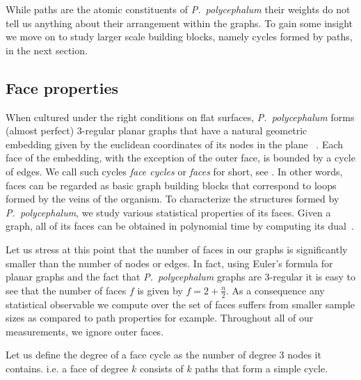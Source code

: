 		While paths are the atomic constituents of \emph{P.~polycephalum} their weights do not tell us anything about their arrangement within the graphs. To gain some insight we move on to study larger scale building blocks, namely cycles formed by paths, in the next section.

	\subsection{Face properties}

		When cultured under the right conditions on flat surfaces, \emph{P.~polycephalum} forms (almost perfect) $3$-regular planar graphs that have a natural geometric embedding given by the euclidean coordinates of its nodes in the plane ~\cite{baumgarten2010plasmodial}. Each face of the embedding, with the exception of the outer face, is bounded by a cycle of edges. We call such cycles \emph{face cycles} or \emph{faces} for short, see . In other words, faces can be regarded as basic graph building blocks that correspond to loops formed by the veins of the organism. To characterize the structures formed by \emph{P.~polycephalum}, we study various statistical properties of its faces. Given a graph, all of its faces can be obtained in polynomial time by computing its dual~\cite{mehlhorn1995leda}. 

		Let us stress at this point that the number of faces in our graphs is significantly smaller than the number of nodes or edges. In fact, using Euler's formula for planar graphs and the fact that \emph{P.~polycephalum} graphs are $3$-regular it is easy to see that the number of faces $f$ is given by $f = 2 + \frac{n}{2}$. As a consequence any statistical observable we compute over the set of faces suffers from smaller sample sizes as compared to path properties for example. Throughout all of our measurements, we ignore outer faces.

		Let us define the degree of a face cycle as the number of degree $3$ nodes it contains. i.e. a face of degree $k$ consists of $k$ paths that form a simple cycle. 

